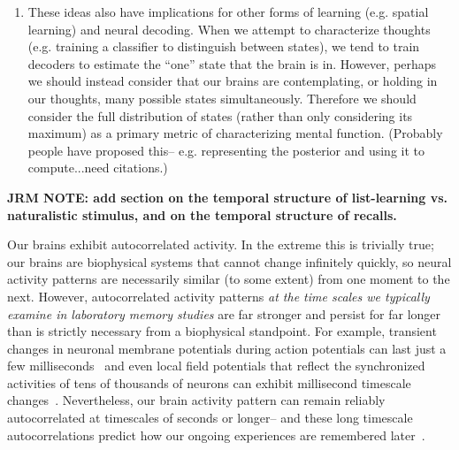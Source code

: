 \begin{enumerate}
    \item These ideas also have implications for other forms of learning (e.g. spatial learning) and neural decoding.  When we attempt to characterize thoughts (e.g. training a classifier to distinguish between states), we tend to train decoders to estimate the ``one'' state that the brain is in.  However, perhaps we should instead consider that our brains are contemplating, or holding in our thoughts, many possible states simultaneously.  Therefore we should consider the full distribution of states (rather than only considering its maximum) as a primary metric of characterizing mental function.  (Probably people have proposed this-- e.g. representing the posterior and using it to compute...need citations.)
    \end{enumerate}


    \textbf{JRM NOTE: add section on the temporal structure of list-learning vs. naturalistic stimulus, and on the temporal structure of recalls.}


    Our brains exhibit autocorrelated activity.  In the extreme this is trivially true; our brains are biophysical systems that cannot change infinitely quickly, so neural activity patterns are necessarily similar (to some extent) from one moment to the next.  However, autocorrelated activity patterns \textit{at the time scales we typically examine in laboratory memory studies} are far stronger and persist for far longer than is strictly necessary from a biophysical standpoint.  For example, transient changes in neuronal membrane potentials during action potentials can last just a few milliseconds~\citep{HodgHuxl52} and even local field potentials that reflect the synchronized activities of tens of thousands of neurons can exhibit millisecond timescale changes~\citep{Frie05, Buzs06}.  Nevertheless, our brain activity pattern can remain reliably autocorrelated at timescales of seconds or longer-- and these long timescale autocorrelations predict how our ongoing experiences are remembered later~\citep[e.g.][]{MannEtal07, MannEtal11, HowaEtal12, FolkEtal18}.




